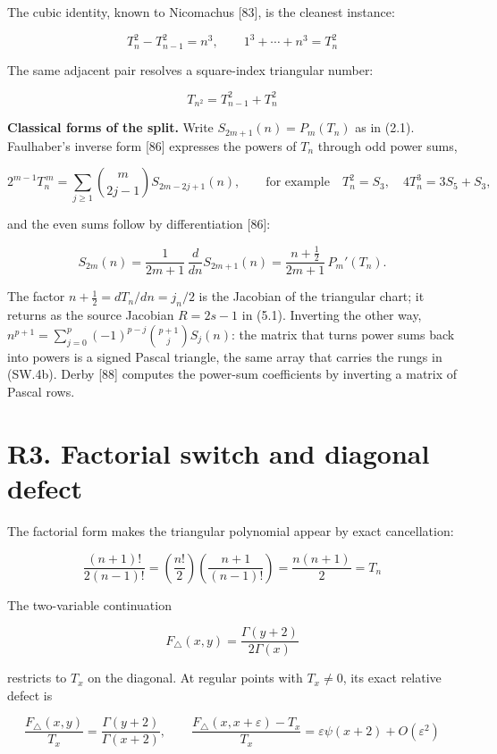 \documentclass[
  11pt,
]{book}
\begin{document}
The cubic identity, known to Nicomachus {[}83{]}, is the cleanest
instance:

\[
\boxed{T_n^2-T_{n-1}^2=n^3,\qquad
1^3+\cdots+n^3=T_n^2}
\tag{2.3}
\]

The same adjacent pair resolves a square-index triangular number:

\[
\boxed{T_{n^2}=T_{n-1}^2+T_n^2}
\tag{2.4}
\]

\textbf{Classical forms of the split.} Write \(S_{2m+1}(n)=P_m(T_n)\) as
in (2.1). Faulhaber's inverse form {[}86{]} expresses the powers of
\(T_n\) through odd power sums,

\[
2^{m-1}T_n^{\,m}=\sum_{j\ge1}\binom{m}{2j-1}S_{2m-2j+1}(n),
\qquad\text{for example}\quad T_n^2=S_3,\quad 4T_n^3=3S_5+S_3,
\tag{2.5}
\]

and the even sums follow by differentiation {[}86{]}:

\[
S_{2m}(n)=\frac1{2m+1}\,\frac{d}{dn}S_{2m+1}(n)
=\frac{n+\frac12}{2m+1}\,P_m'(T_n).
\tag{2.6}
\]

The factor \(n+\tfrac12=dT_n/dn=j_n/2\) is the Jacobian of the
triangular chart; it returns as the source Jacobian \(R=2s-1\) in (5.1).
Inverting the other way,
\(n^{p+1}=\sum_{j=0}^{p}(-1)^{p-j}\binom{p+1}{j}S_j(n)\): the matrix
that turns power sums back into powers is a signed Pascal triangle, the
same array that carries the rungs in (SW.4b). Derby {[}88{]} computes
the power-sum coefficients by inverting a matrix of Pascal rows.

\section{R3. Factorial switch and diagonal
defect}\label{r3.-factorial-switch-and-diagonal-defect}

The factorial form makes the triangular polynomial appear by exact
cancellation:

\[
\boxed{
\frac{(n+1)!}{2(n-1)!}
=\left(\frac{n!}{2}\right)
 \left(\frac{n+1}{(n-1)!}\right)
=\frac{n(n+1)}2=T_n}
\tag{3.1}
\]

The two-variable continuation

\[
F_\triangle(x,y)=\frac{\Gamma(y+2)}{2\Gamma(x)}
\tag{3.2}
\]

restricts to \(T_x\) on the diagonal. At regular points with
\(T_x\ne0\), its exact relative defect is

\[
\boxed{
\frac{F_\triangle(x,y)}{T_x}
=\frac{\Gamma(y+2)}{\Gamma(x+2)},\qquad
\frac{F_\triangle(x,x+\varepsilon)-T_x}{T_x}
=\varepsilon\psi(x+2)+O(\varepsilon^2)}
\tag{3.3}
\]
\end{document}

